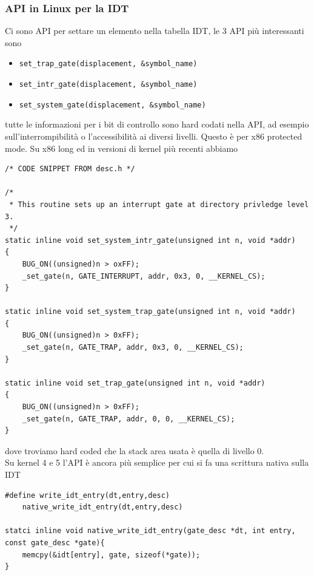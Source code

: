 \documentclass[12pt, oneside]{extbook}
\begin{document}
\subsubsection{API in Linux per la IDT}
Ci sono API per settare un elemento nella tabella IDT, le 3 API più interessanti sono
\begin{itemize}
\item \texttt{set\_trap\_gate(displacement, \&symbol\_name)}
\item \texttt{set\_intr\_gate(displacement, \&symbol\_name)}
\item \texttt{set\_system\_gate(displacement, \&symbol\_name)}
\end{itemize}
tutte le informazioni per i bit di controllo sono hard codati nella API, ad esempio sull'interrompibilità o l'accessibilità ai diversi livelli. Questo è per x86 protected mode.
Su x86 long ed in versioni di kernel più recenti abbiamo
\begin{lstlisting}
/* CODE SNIPPET FROM desc.h */

/*
 * This routine sets up an interrupt gate at directory privledge level 3.
 */
static inline void set_system_intr_gate(unsigned int n, void *addr)
{
	BUG_ON((unsigned)n > oxFF);
	_set_gate(n, GATE_INTERRUPT, addr, 0x3, 0, __KERNEL_CS);
}

static inline void set_system_trap_gate(unsigned int n, void *addr)
{
	BUG_ON((unsigned)n > 0xFF);
	_set_gate(n, GATE_TRAP, addr, 0x3, 0, __KERNEL_CS);
}

static inline void set_trap_gate(unsigned int n, void *addr)
{
	BUG_ON((unsigned)n > 0xFF);
	_set_gate(n, GATE_TRAP, addr, 0, 0, __KERNEL_CS);
}
\end{lstlisting}
dove troviamo hard coded che la stack area usata è quella di livello 0.\\Su kernel 4 e 5 l'API è ancora più semplice per cui si fa una scrittura nativa sulla IDT
\begin{lstlisting}
#define write_idt_entry(dt,entry,desc)
	native_write_idt_entry(dt,entry,desc)
	
statci inline void native_write_idt_entry(gate_desc *dt, int entry, const gate_desc *gate){
	memcpy(&idt[entry], gate, sizeof(*gate));
}
\end{lstlisting}
\end{document}
